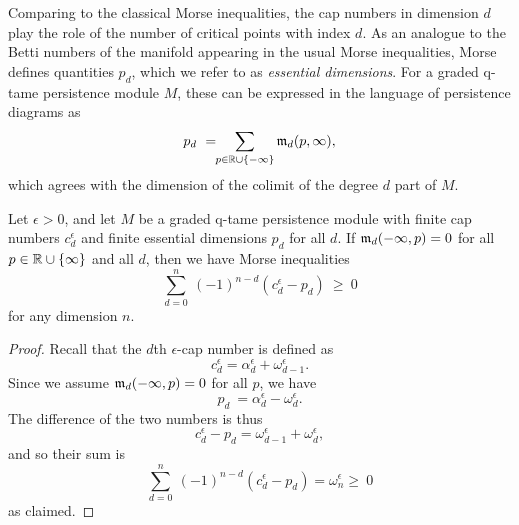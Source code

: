 Comparing to the classical Morse inequalities, the cap numbers in dimension $d$ play the role of the number of critical points with index $d$.
As an analogue to the Betti numbers of the manifold appearing in the usual Morse inequalities, Morse defines quantities $p_{d}$, which we refer to as \emph{essential dimensions}.
For a graded q-tame persistence module $M$, these can be expressed in the language of persistence diagrams as
\[
p_{d} \ = \!\! \sum_{p \in \mathbb{R} \cup \{-\infty\}} \mathfrak{m}_d(p,\infty),
\]
which agrees with the dimension of the colimit of the degree $d$ part of $M$.

\begin{thm} \label{t:inequalities}
	Let $\epsilon > 0$, and let $M$ be a graded q-tame persistence module
	with finite cap numbers $c_{d}^{\epsilon}$ and finite essential dimensions $p_{d}$ for all $d$.
	If $\mathfrak{m}_d(-\infty, p) = 0$ for all $p \in \mathbb{R} \cup \{\infty\}$ and all $d$, then we have Morse inequalities
	\begin{equation} \label{e:morse inequalities}
	\sum_{d=0}^n \ (-1)^{n-d} (c_{d}^{\epsilon} - p_{d}) \ \geq\ 0
	\end{equation}
	for any dimension $n$.
\end{thm}


\begin{proof}
Recall that the $d$th $\epsilon$-cap number is defined as
\[c_{d}^{\epsilon} = \alpha_{d}^{\epsilon} + \omega_{d-1}^{\epsilon}.\]
Since we assume $\mathfrak{m}_d(-\infty, p) = 0$ for all $p$, we have
	\begin{equation*}
	p_{d} \ = \alpha_{d}^{\epsilon} - \omega_{d}^{\epsilon}.
	\end{equation*}
The difference of the two numbers is thus
\[
c_{d}^{\epsilon} - p_{d} = \omega_{d-1}^{\epsilon} + \omega_{d}^{\epsilon},
\]
and so their sum is
\[
\sum_{d=0}^n \ (-1)^{n-d} (c_{d}^{\epsilon} - p_{d}) = \omega_{n}^{\epsilon} \geq\ 0
\]
as claimed.
\end{proof}

